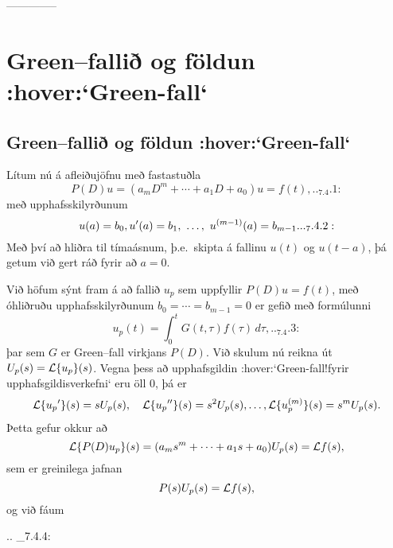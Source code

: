 --------------

  

\section{Green--fallið og  földun :hover:`Green-fall`}

\subsection{Green--fallið og  földun :hover:`Green-fall`}


\noindent
Lítum nú á afleiðujöfnu með fastastuðla
 \begin{equation*}
P(D)u=(a_mD^m+\cdots+a_1D+a_0)u=f(t),

.. _7.4.1:

 \end{equation*}
með upphafsskilyrðunum
 \begin{equation*}
u(a)=b_0, u\dash(a)=b_1,\  \dots,  \  u^{(m-1)}(a)=b_{m-1}.

.. _7.4.2:

 \end{equation*}
Með því að hliðra til tímaásnum, þ.e.~skipta á fallinu $u(t)$ og
$u(t-a)$, þá getum við gert ráð fyrir að $a=0$.  


Við höfum
sýnt fram á að fallið $u_p$ sem uppfyllir $P(D)u=f(t)$, með
óhliðruðu upphafsskilyrðunum $b_0=\cdots=b_{m-1}=0$ er gefið með
formúlunni
 \begin{equation*}u_p(t)=\int_0^tG(t,\tau) f(\tau)\, d\tau,

.. _7.4.3:

 \end{equation*}
þar sem $G$ er Green--fall virkjans $P(D)$.
Við skulum nú reikna út $U_p(s)={\cal L}\{u_p\}(s)$.  Vegna
þess að upphafsgildin :hover:`Green-fall!fyrir upphafsgildisverkefni`
eru öll 0, þá er
\begin{equation*}
{\cal L}\{u_p{\sp{\prime}}\}(s)=sU_p(s), \quad 
{\cal L}\{u_p{\sp{\prime\prime}}\}(s)=s^2U_p(s),\dots,
{\cal L}\{u_p^{(m)}\}(s)=s^mU_p(s).
\end{equation*}
Þetta gefur okkur að 
$$ {\cal L}\{P(D)u_p\}(s)=(a_ms^m+\cdots+a_1s+a_0)U_p(s)={\cal L} f(s), $$
sem er greinilega jafnan
$$ P(s)U_p(s)={\cal L} f(s), $$
og við fáum 

.. _7.4.4:

